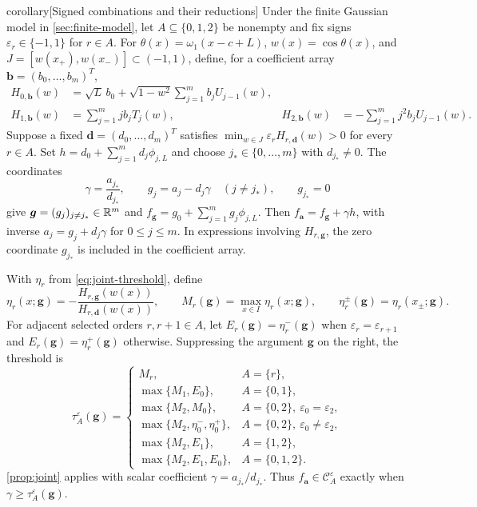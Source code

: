 \begin{theoremEnd}[normal,category=combinations]{corollary}[Signed combinations and their reductions]
\label{cor:combinations}
Under the finite Gaussian model in \cref{sec:finite-model}, let
$A\subseteq\{0,1,2\}$ be nonempty and fix signs
$\varepsilon_r\in\{-1,1\}$ for $r\in A$.
For $\theta(x)=\omega_1(x-c+L)$, $w(x)=\cos\theta(x)$, and
$J=[w(x_+),w(x_-)]\subset(-1,1)$, define, for a coefficient array
$\boldsymbol b=(b_0,\ldots,b_m)^T$,
\[
 \begin{aligned}
 H_{0,\boldsymbol b}(w)
   &=\sqrt L\,b_0+\sqrt{1-w^2}\sum_{j=1}^m b_jU_{j-1}(w),\\
 H_{1,\boldsymbol b}(w)&=\sum_{j=1}^m jb_jT_j(w),&
 H_{2,\boldsymbol b}(w)&=-\sum_{j=1}^m j^2b_jU_{j-1}(w).
 \end{aligned}
\]
Suppose a fixed $\boldsymbol d=(d_0,\ldots,d_m)^T$ satisfies
$\min_{w\in J}\varepsilon_rH_{r,\boldsymbol d}(w)>0$ for every
$r\in A$. Set $h=d_0+\sum_{j=1}^m d_j\phi_{j,L}$ and choose
$j_*\in\{0,\ldots,m\}$ with $d_{j_*}\ne0$. The coordinates
\[
 \gamma=\frac{a_{j_*}}{d_{j_*}},\qquad
 g_j=a_j-d_j\gamma\quad(j\ne j_*),\qquad g_{j_*}=0
\]
give $\boldsymbol g=(g_j)_{j\ne j_*}\in\mathbb R^m$ and
$f_{\boldsymbol g}=g_0+\sum_{j=1}^m g_j\phi_{j,L}$.
Then $f_{\boldsymbol a}=f_{\boldsymbol g}+\gamma h$, with inverse
$a_j=g_j+d_j\gamma$ for $0\leq j\leq m$.
In expressions involving $H_{r,\boldsymbol g}$, the zero coordinate
$g_{j_*}$ is included in the coefficient array.

With $\eta_r$ from \cref{eq:joint-threshold}, define
\[
 \eta_r(x;\boldsymbol g)
   =-\frac{H_{r,\boldsymbol g}(w(x))}{H_{r,\boldsymbol d}(w(x))},
 \qquad M_r(\boldsymbol g)=\max_{x\in I}\eta_r(x;\boldsymbol g),
 \qquad \eta_r^\pm(\boldsymbol g)=\eta_r(x_\pm;\boldsymbol g).
\]
For adjacent selected orders $r,r+1\in A$, let
$E_r(\boldsymbol g)=\eta_r^-(\boldsymbol g)$ when
$\varepsilon_r=\varepsilon_{r+1}$ and
$E_r(\boldsymbol g)=\eta_r^+(\boldsymbol g)$ otherwise.
Suppressing the argument $\boldsymbol g$ on the right, the threshold is
\[
 \tau_A^\varepsilon(\boldsymbol g)=
 \begin{cases}
 M_r, & A=\{r\},\\
 \max\{M_1,E_0\}, & A=\{0,1\},\\
 \max\{M_2,M_0\}, & A=\{0,2\},\ \varepsilon_0=\varepsilon_2,\\
 \max\{M_2,\eta_0^-,\eta_0^+\},
     & A=\{0,2\},\ \varepsilon_0\ne\varepsilon_2,\\
 \max\{M_2,E_1\}, & A=\{1,2\},\\
 \max\{M_2,E_1,E_0\}, & A=\{0,1,2\}.
 \end{cases}
\]
\cref{prop:joint} applies with scalar coefficient
$\gamma=a_{j_*}/d_{j_*}$. Thus
$f_{\boldsymbol a}\in\mathcal C_A^\varepsilon$ exactly when
$\gamma\geq\tau_A^\varepsilon(\boldsymbol g)$.


\end{theoremEnd}
